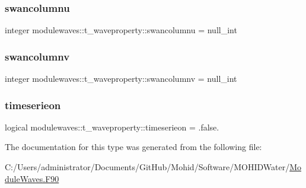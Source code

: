 \subsubsection{\texorpdfstring{swancolumnu}{swancolumnu}}
{\footnotesize\ttfamily integer modulewaves\+::t\+\_\+waveproperty\+::swancolumnu = null\+\_\+int\hspace{0.3cm}{\ttfamily [private]}}

\mbox{\label{structmodulewaves_1_1t__waveproperty_a1e7a6c31095ef36aba95a30d596f6744}} 
\subsubsection{\texorpdfstring{swancolumnv}{swancolumnv}}
{\footnotesize\ttfamily integer modulewaves\+::t\+\_\+waveproperty\+::swancolumnv = null\+\_\+int\hspace{0.3cm}{\ttfamily [private]}}

\mbox{\label{structmodulewaves_1_1t__waveproperty_a1e81faed73037648d91cb668e56ad778}} 
\subsubsection{\texorpdfstring{timeserieon}{timeserieon}}
{\footnotesize\ttfamily logical modulewaves\+::t\+\_\+waveproperty\+::timeserieon = .false.\hspace{0.3cm}{\ttfamily [private]}}



The documentation for this type was generated from the following file\+:\begin{DoxyCompactItemize}
\item 
C\+:/\+Users/administrator/\+Documents/\+Git\+Hub/\+Mohid/\+Software/\+M\+O\+H\+I\+D\+Water/\mbox{\hyperlink{_module_waves_8_f90}{Module\+Waves.\+F90}}\end{DoxyCompactItemize}
